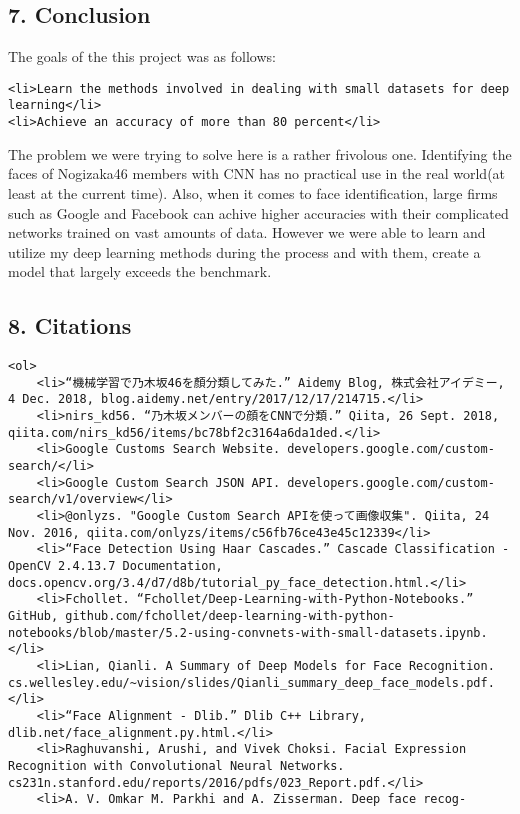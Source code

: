 \documentclass[11pt]{article}
\begin{document}
    \subsection{7. Conclusion}\label{conclusion}

The goals of the this project was as follows:

\begin{verbatim}
<li>Learn the methods involved in dealing with small datasets for deep learning</li>
<li>Achieve an accuracy of more than 80 percent</li>
\end{verbatim}

The problem we were trying to solve here is a rather frivolous one.
Identifying the faces of Nogizaka46 members with CNN has no practical
use in the real world(at least at the current time). Also, when it comes
to face identification, large firms such as Google and Facebook can
achive higher accuracies with their complicated networks trained on vast
amounts of data. However we were able to learn and utilize my deep
learning methods during the process and with them, create a model that
largely exceeds the benchmark.

    \subsection{8. Citations}\label{citations}

\begin{verbatim}
<ol>
    <li>“機械学習で乃木坂46を顏分類してみた.” Aidemy Blog, 株式会社アイデミー, 4 Dec. 2018, blog.aidemy.net/entry/2017/12/17/214715.</li>
    <li>nirs_kd56. “乃木坂メンバーの顔をCNNで分類.” Qiita, 26 Sept. 2018, qiita.com/nirs_kd56/items/bc78bf2c3164a6da1ded.</li>
    <li>Google Customs Search Website. developers.google.com/custom-search/</li>
    <li>Google Custom Search JSON API. developers.google.com/custom-search/v1/overview</li>
    <li>@onlyzs. "Google Custom Search APIを使って画像収集". Qiita, 24 Nov. 2016, qiita.com/onlyzs/items/c56fb76ce43e45c12339</li>
    <li>“Face Detection Using Haar Cascades.” Cascade Classification - OpenCV 2.4.13.7 Documentation, docs.opencv.org/3.4/d7/d8b/tutorial_py_face_detection.html.</li>
    <li>Fchollet. “Fchollet/Deep-Learning-with-Python-Notebooks.” GitHub, github.com/fchollet/deep-learning-with-python-notebooks/blob/master/5.2-using-convnets-with-small-datasets.ipynb.</li>
    <li>Lian, Qianli. A Summary of Deep Models for Face Recognition. cs.wellesley.edu/~vision/slides/Qianli_summary_deep_face_models.pdf.</li>
    <li>“Face Alignment - Dlib.” Dlib C++ Library, dlib.net/face_alignment.py.html.</li>
    <li>Raghuvanshi, Arushi, and Vivek Choksi. Facial Expression Recognition with Convolutional Neural Networks. cs231n.stanford.edu/reports/2016/pdfs/023_Report.pdf.</li>
    <li>A. V. Omkar M. Parkhi and A. Zisserman. Deep face recog-
\end{verbatim}
\end{document}
